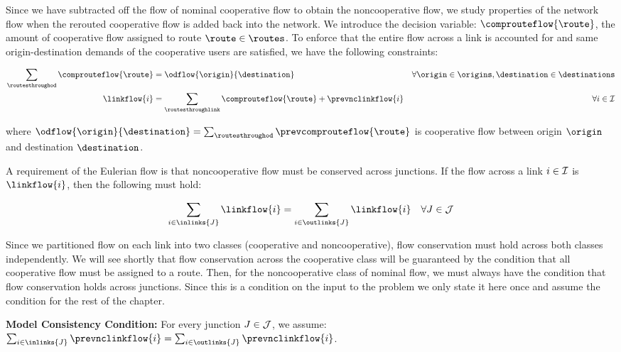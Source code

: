 Since we have subtracted off the flow of nominal cooperative flow
to obtain the noncooperative flow, we study properties of the network
flow when the rerouted cooperative flow is added back into the network.
We introduce the decision variable: $\comprouteflow{\route}$, the
amount of cooperative flow assigned to route $\route\in\routes$.
To enforce that the entire flow across a link is accounted for and
same origin-destination demands of the cooperative users are satisfied,
we have the following constraints:

\begin{eqnarray}
\sum_{\routesthroughod}\comprouteflow{\route} & =\odflow{\origin}{\destination} & \forall\origin\in\origins,\destination\in\destinations\label{eq:od-flow}\\
\linkflow{\link} & =\sum\limits _{\routesthroughlink}\comprouteflow{\route}+\prevnclinkflow{\link} & \forall\link\in\links\label{eq:link-flow}
\end{eqnarray}


where $\odflow{\origin}{\destination}=\sum_{\routesthroughod}\prevcomprouteflow{\route}$
is cooperative flow between origin $\origin$ and destination $\destination$.

A requirement of the Eulerian flow is that noncooperative flow must
be conserved across junctions. If the flow across a link $i\in\mathcal{I}$
is $\linkflow{\link}$, then the following must hold:

\begin{eqnarray}
\sum_{\link\in\inlinks{\junction}}\linkflow{\link} & =\sum\limits _{\link\in\outlinks{\junction}}\linkflow{\link} & \forall\junction\in\junctions\label{eq:mass-balance}
\end{eqnarray}


Since we partitioned flow on each link into two classes (cooperative
and noncooperative), flow conservation must hold across both classes
independently. We will see shortly that flow conservation across the
cooperative class will be guaranteed by the condition that all cooperative
flow must be assigned to a route. Then, for the noncooperative class
of nominal flow, we must always have the condition that flow conservation
holds across junctions. Since this is a condition on the input to
the problem we only state it here once and assume the condition for
the rest of the chapter.

\textbf{Model Consistency Condition: }For every junction $J\in\mathcal{J}$,
we assume: $\sum_{\link\in\inlinks{\junction}}\prevnclinkflow{\link}=\sum_{\link\in\outlinks{\junction}}\prevnclinkflow{\link}$.

